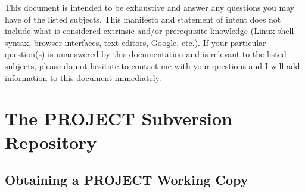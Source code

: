 \documentclass[12pt,letterpaper]{article}
\begin{document}
This document is intended to be exhaustive and answer any questions you may have of the listed subjects.  This manifesto and statement of intent does not include what is considered extrinsic and/or prerequisite knowledge (Linux shell syntax, browser interfaces, text editors, Google, etc.).  If your particular question(s) is unanswered by this documentation and is relevant to the listed subjects, please do not hesitate to contact me with your questions and I will add information to this document immediately.

\section{The PROJECT Subversion Repository}

\subsection{Obtaining a PROJECT Working Copy}
\end{document}
